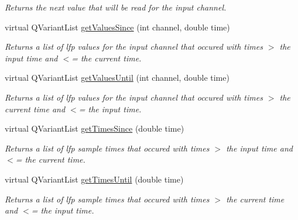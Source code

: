 \begin{DoxyCompactItemize}
\begin{DoxyCompactList}\small\item\em Returns the next value that will be read for the input channel. \end{DoxyCompactList}\item 
\hypertarget{class_picto_1_1_live_lfp_reader_abfef51f0ab5194657c3b7adfa23ef7bb}{virtual Q\-Variant\-List \hyperlink{class_picto_1_1_live_lfp_reader_abfef51f0ab5194657c3b7adfa23ef7bb}{get\-Values\-Since} (int channel, double time)}\label{class_picto_1_1_live_lfp_reader_abfef51f0ab5194657c3b7adfa23ef7bb}

\begin{DoxyCompactList}\small\item\em Returns a list of lfp values for the input channel that occured with times $>$ the input time and $<$= the current time. \end{DoxyCompactList}\item 
\hypertarget{class_picto_1_1_live_lfp_reader_a62252bcd22e61191d7ca25c030fe0657}{virtual Q\-Variant\-List \hyperlink{class_picto_1_1_live_lfp_reader_a62252bcd22e61191d7ca25c030fe0657}{get\-Values\-Until} (int channel, double time)}\label{class_picto_1_1_live_lfp_reader_a62252bcd22e61191d7ca25c030fe0657}

\begin{DoxyCompactList}\small\item\em Returns a list of lfp values for the input channel that occured with times $>$ the current time and $<$= the input time. \end{DoxyCompactList}\item 
\hypertarget{class_picto_1_1_live_lfp_reader_ad97a0b12a93a66f6b8abadd9ad143a3f}{virtual Q\-Variant\-List \hyperlink{class_picto_1_1_live_lfp_reader_ad97a0b12a93a66f6b8abadd9ad143a3f}{get\-Times\-Since} (double time)}\label{class_picto_1_1_live_lfp_reader_ad97a0b12a93a66f6b8abadd9ad143a3f}

\begin{DoxyCompactList}\small\item\em Returns a list of lfp sample times that occured with times $>$ the input time and $<$= the current time. \end{DoxyCompactList}\item 
\hypertarget{class_picto_1_1_live_lfp_reader_ade90e7f616735cf415e041cd57c82c56}{virtual Q\-Variant\-List \hyperlink{class_picto_1_1_live_lfp_reader_ade90e7f616735cf415e041cd57c82c56}{get\-Times\-Until} (double time)}\label{class_picto_1_1_live_lfp_reader_ade90e7f616735cf415e041cd57c82c56}

\begin{DoxyCompactList}\small\item\em Returns a list of lfp sample times that occured with times $>$ the current time and $<$= the input time. \end{DoxyCompactList}\end{DoxyCompactItemize}


